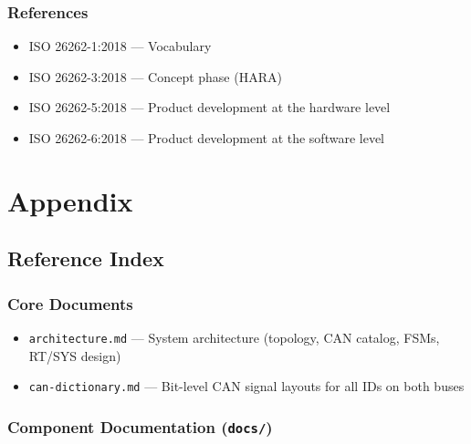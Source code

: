 \documentclass[12pt,a4paper,oneside]{report}
\providecommand{\tightlist}{\setlength{\itemsep}{0pt}\setlength{\parskip}{0pt}}
\begin{document}
\section{References}\label{references}

\begin{itemize}
\tightlist
\item
  ISO 26262-1:2018 --- Vocabulary
\item
  ISO 26262-3:2018 --- Concept phase (HARA)
\item
  ISO 26262-5:2018 --- Product development at the hardware level
\item
  ISO 26262-6:2018 --- Product development at the software level
\end{itemize}



\appendix
\part*{Appendix}

\chapter{Reference Index}

\section{Core Documents}

\begin{itemize}[leftmargin=*,nosep]
  \item \texttt{architecture.md} --- System architecture (topology, CAN catalog, FSMs, RT/SYS design)
  \item \texttt{can-dictionary.md} --- Bit-level CAN signal layouts for all IDs on both buses
\end{itemize}

\section{Component Documentation (\texttt{docs/})}
\end{document}
